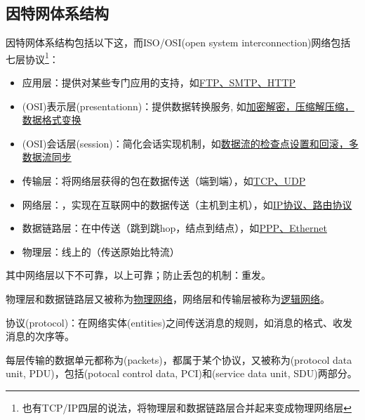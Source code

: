 \subsection{因特网体系结构}
因特网体系结构包括以下这，而ISO/OSI(open system interconnection)网络包括七层协议\footnote{也有TCP/IP四层的说法，将物理层和数据链路层合并起来变成物理网络层}：
\begin{itemize}
	\item 应用层：提供对某些专门应用的支持，如\underline{FTP、SMTP、HTTP}
	\item (OSI)表示层(presentationn)：提供数据转换服务, 如\underline{加密解密，压缩解压缩，数据格式变换}
	\item (OSI)会话层(session)：简化会话实现机制，如\underline{数据流的检查点设置和回滚，多数据流同步}
	\item 传输层：将网络层获得的包在数据传送（端到端），如\underline{TCP、UDP}
	\item 网络层：，实现在互联网中的数据传送（主机到主机），如\underline{IP协议、路由协议}
	\item 数据链路层：在中传送（跳到跳hop，结点到结点），如\underline{PPP、Ethernet}
	\item 物理层：线上的（传送原始比特流）
\end{itemize}
\par 其中网络层以下不可靠，以上可靠；防止丢包的机制：重发。
\par 物理层和数据链路层又被称为\underline{物理网络}，网络层和传输层被称为\underline{逻辑网络}。

\myhline
协议(protocol)：在网络实体(entities)之间传送消息的规则，如消息的格式、收发消息的次序等。

每层传输的数据单元都称为(packets)，都属于某个协议，又被称为(protocol data unit, PDU)，包括(potocal control data, PCI)和(service data unit, SDU)两部分。

